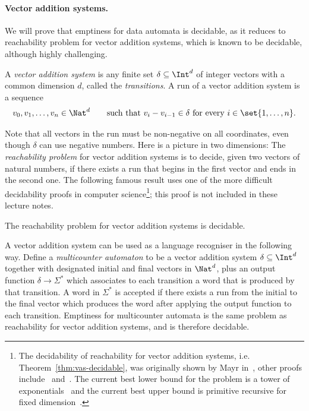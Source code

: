 \paragraph{Vector addition systems.}
We will prove that emptiness for data automata is decidable, as it reduces to reachability problem for vector addition systems, which is known to be decidable, although highly challenging. 

\begin{definition}
	A \emph{vector addition system} is any finite set $\delta \subseteq \Int^d$ of integer vectors with a common dimension $d$, called the \emph{transitions}. A run of a vector addition system is a sequence
	\begin{align*}
		v_0,v_1,\ldots,v_n \in \Nat^d \qquad\mbox{such that $v_i - v_{i-1} \in \delta$ for every $i \in \set{1,\ldots,n}$}.
	\end{align*}	
\end{definition}

Note that all vectors in the run must be non-negative on all coordinates, even though $\delta$ can use negative numbers. Here is a picture in two dimensions: 
The \emph{reachability problem} for vector addition systems is to decide, given two vectors of natural numbers, if there exists a run that begins in the first vector and ends in the second one. The following famous result uses one of the more difficult decidability proofs in computer science\footnote{The decidability of reachability for vector addition systems, i.e.~
Theorem~\ref{thm:vas-decidable}, was originally shown by Mayr in~\cite{DBLP:journals/siamcomp/Mayr84}, other proofs include~\cite{DBLP:conf/stoc/Kosaraju82} and~\cite{DBLP:journals/corr/abs-1009-1076}. The current best lower bound for the problem is a tower of exponentials~\cite{czerwinski_reachability_2018} and the current best upper bound is primitive recursive for fixed dimension~\cite{leroux_reachability_2019}.
}; this proof is not included in these lecture notes.
\begin{theorem}\label{thm:vas-decidable}
	The reachability problem for vector addition systems is decidable.
\end{theorem}


A vector addition system can be used as a language recogniser in the following way. Define a \emph{multicounter automaton} to be a vector addition system $\delta \subseteq \Int^d$ together with designated initial and final vectors in $\Nat^d$, plus an output function $\delta \to \Sigma^*$ which associates to each transition a word that is produced by that transition. A word in $\Sigma^*$ is accepted if there exists a run from the initial to the final vector which produces the word after applying the output function to each transition. Emptiness for multicounter automata is the same problem as reachability for vector addition systems, and is therefore decidable.

